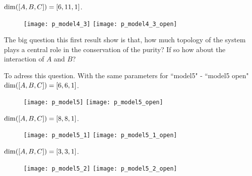\documentclass[floatfix]{article}
\newcommand*{\ud}{
\underline{\space\space}}
\begin{document}
${\rm dim}([A,B,C])=[6,11,1]$.

\begin{figure}[H]
\begin{center}
\texttt{[image: p\_model4\_3]}  
\texttt{[image: p\_model4\_3\_open]}  
\end{center}
\caption{}
\label{p_m4}
\end{figure}

The big question this first result show is that,  how much topology of the system plays a central role in the conservation of the purity? If so how about the interaction of $A$ and $B$?

To adress this question.
With the same parameters for ``model5" - ``model5\ud open"  ${\rm dim}([A,B,C])=[6,6,1]$.

\begin{figure}[H]
\begin{center}
\texttt{[image: p\_model5]}  
\texttt{[image: p\_model5\_open]}  
\end{center}
\caption{}
\label{p_m4}
\end{figure}


${\rm dim}([A,B,C])=[8,8,1]$.

\begin{figure}[H]
\begin{center}
\texttt{[image: p\_model5\_1]}  
\texttt{[image: p\_model5\_1\_open]}  
\end{center}
\caption{}
\label{p_m4}
\end{figure}


${\rm dim}([A,B,C])=[3,3,1]$.

\begin{figure}[H]
\begin{center}
\texttt{[image: p\_model5\_2]}  
\texttt{[image: p\_model5\_2\_open]}  
\end{center}
\caption{}
\label{p_m4}
\end{figure}
\end{document}
